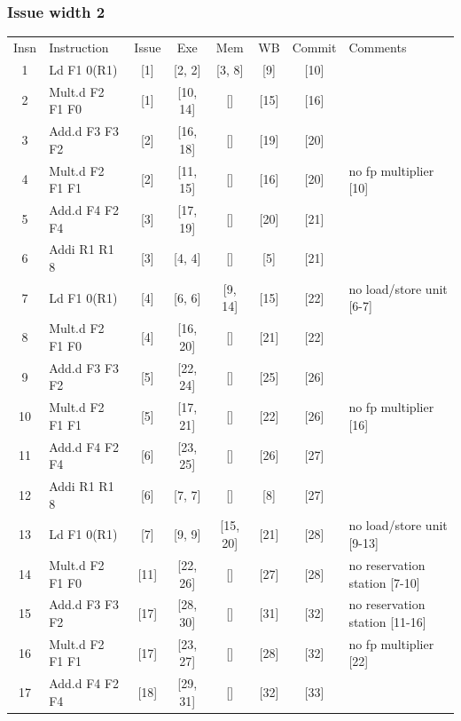 \documentclass[11pt]{article}
\begin{document}
\subsubsection*{Issue width 2}
\begin{center}
\scriptsize
\setlength{\tabcolsep}{8pt}
\renewcommand{\arraystretch}{1.35}
\begin{tabular}{clccccc>{\raggedright\arraybackslash}p{1.4in}}
Insn & Instruction & Issue & Exe & Mem & WB & Commit & Comments \\
1 & Ld F1 0(R1) & [1] & [2, 2] & [3, 8] & [9] & [10] &  \\
2 & Mult.d F2 F1 F0 & [1] & [10, 14] & [] & [15] & [16] &  \\
3 & Add.d F3 F3 F2 & [2] & [16, 18] & [] & [19] & [20] &  \\
4 & Mult.d F2 F1 F1 & [2] & [11, 15] & [] & [16] & [20] & no fp multiplier [10] \\
5 & Add.d F4 F2 F4 & [3] & [17, 19] & [] & [20] & [21] &  \\
6 & Addi R1 R1 8 & [3] & [4, 4] & [] & [5] & [21] &  \\
7 & Ld F1 0(R1) & [4] & [6, 6] & [9, 14] & [15] & [22] & no load/store unit [6-7] \\
8 & Mult.d F2 F1 F0 & [4] & [16, 20] & [] & [21] & [22] &  \\
9 & Add.d F3 F3 F2 & [5] & [22, 24] & [] & [25] & [26] &  \\
10 & Mult.d F2 F1 F1 & [5] & [17, 21] & [] & [22] & [26] & no fp multiplier [16] \\
11 & Add.d F4 F2 F4 & [6] & [23, 25] & [] & [26] & [27] &  \\
12 & Addi R1 R1 8 & [6] & [7, 7] & [] & [8] & [27] &  \\
13 & Ld F1 0(R1) & [7] & [9, 9] & [15, 20] & [21] & [28] & no load/store unit [9-13] \\
14 & Mult.d F2 F1 F0 & [11] & [22, 26] & [] & [27] & [28] & no reservation station [7-10] \\
15 & Add.d F3 F3 F2 & [17] & [28, 30] & [] & [31] & [32] & no reservation station [11-16] \\
16 & Mult.d F2 F1 F1 & [17] & [23, 27] & [] & [28] & [32] & no fp multiplier [22] \\
17 & Add.d F4 F2 F4 & [18] & [29, 31] & [] & [32] & [33] &  \\
\end{tabular}
\end{center}
\end{document}
